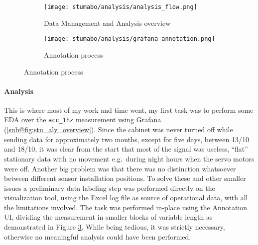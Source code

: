 \begin{figure}[ht]
    \begin{subfigure}{.495\textwidth}
        \texttt{[image: stumabo/analysis/analysis\_flow.png]}
        \caption{Data Management and Analysis overview}
        \label{fig:stu_aly_overview}
    \end{subfigure}
    \begin{subfigure}{.495\textwidth}
        \texttt{[image: stumabo/analysis/grafana-annotation.png]} 
        \caption{Annotation process}
        \label{fig:stu_annotation}
    \end{subfigure}
\end{figure}

\paragraph{Analysis}
This is where most of my work and time went, my first task was to perform some \acl{EDA} over the \texttt{acc\_1hz} measurement using Grafana (\ref{sub@fig:stu_aly_overview}).
Since the cabinet was never turned off while sending data for approximately two months, except for five days, between 13/10 and 18/10, it was clear from the start that most of 
the signal was useless, ``flat'' stationary data with no movement e.g.\ during night hours when the servo motors were off. 
Another big problem was that there was no distinction whatsoever between different sensor installation positions.
To solve these and other smaller issues a preliminary data labeling step was performed directly on the visualization tool, using the Excel log file as source of 
operational data, with all the limitations involved. The task was performed in-place using the Annotation UI, dividing the measurement in smaller blocks of variable length 
as demonstrated in Figure \ref{fig:stu_annotation}. While being tedious, it was strictly necessary, otherwise no meaningful analysis could have been performed.

